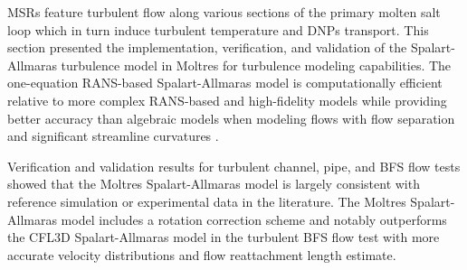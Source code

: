 \glspl{MSR} feature turbulent flow along various sections of the primary molten salt loop which in
turn induce turbulent temperature and \glspl{DNP} transport. This section presented the
implementation, verification, and validation of the Spalart-Allmaras turbulence model
\cite{spalart_one-equation_1994} in Moltres for turbulence
modeling capabilities. The one-equation \gls{RANS}-based Spalart-Allmaras model is computationally
efficient relative to more complex \gls{RANS}-based and high-fidelity models while providing better
accuracy than algebraic models when modeling flows with flow separation and significant streamline
curvatures \cite{wilcox_turbulence_2006}.

Verification and validation results for turbulent channel, pipe, and \gls{BFS} flow tests showed
that the Moltres Spalart-Allmaras model is largely consistent with reference simulation or experimental
data in the literature. The Moltres Spalart-Allmaras model includes a rotation correction scheme
\cite{aupoix_extensions_2003, dacles-mariani_numericalexperimental_1995} and notably outperforms
the CFL3D Spalart-Allmaras model in the turbulent \gls{BFS} flow test with more accurate velocity
distributions and flow reattachment length estimate.
